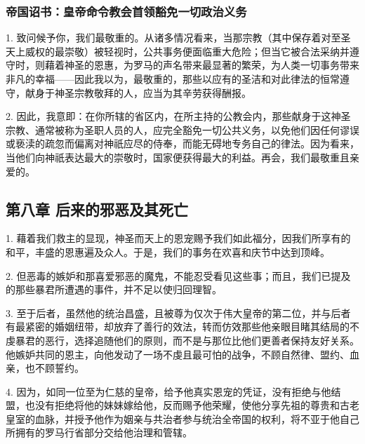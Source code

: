 
\subsubsection{帝国诏书：皇帝命令教会首领豁免一切政治义务}

1. 致问候予你，我们最敬重的。从诸多情况看来，当那宗教（其中保存着对至圣天上威权的最崇敬）被轻视时，公共事务便面临重大危险；但当它被合法采纳并遵守时，则藉着神圣的恩惠，为罗马的声名带来最显著的繁荣，为人类一切事务带来非凡的幸福——因此我以为，最敬重的，那些以应有的圣洁和对此律法的恒常遵守，献身于神圣宗教敬拜的人，应当为其辛劳获得酬报。\par

2. 因此，我意即：在你所辖的省区内，在所主持的公教会内，那些献身于这神圣宗教、通常被称为圣职人员的人，应完全豁免一切公共义务，以免他们因任何谬误或亵渎的疏忽而偏离对神祇应尽的侍奉，而能无碍地专务自己的律法。因为看来，当他们向神祇表达最大的崇敬时，国家便获得最大的利益。再会，我们最敬重且亲爱的。\par


\subsection{第八章 后来的邪恶及其死亡}

1. 藉着我们救主的显现，神圣而天上的恩宠赐予我们如此福分，因我们所享有的和平，丰盛的恩惠遍及众人。于是，我们的事务在欢喜和庆节中达到顶峰。\par

2. 但恶毒的嫉妒和那喜爱邪恶的魔鬼，不能忍受看见这些事；而且，我们已提及的那些暴君所遭遇的事件，并不足以使归回理智。\par

3. 至于后者，虽然他的统治昌盛，且被尊为仅次于伟大皇帝的第二位，并与后者有最紧密的婚姻纽带，却放弃了善行的效法，转而仿效那些他亲眼目睹其结局的不虔暴君的恶行，选择追随他们的原则，而不是与那位比他们更善者保持友好关系。他嫉妒共同的恩主，向他发动了一场不虔且最可怕的战争，不顾自然律、盟约、血亲，也不顾誓约。\par

4. 因为，如同一位至为仁慈的皇帝，给予他真实恩宠的凭证，没有拒绝与他结盟，也没有拒绝将他的妹妹嫁给他，反而赐予他荣耀，使他分享先祖的尊贵和古老皇室的血脉，并授予他作为姻亲与共治者参与统治全帝国的权利，将不亚于他自己所拥有的罗马行省部分交给他治理和管辖。\par

